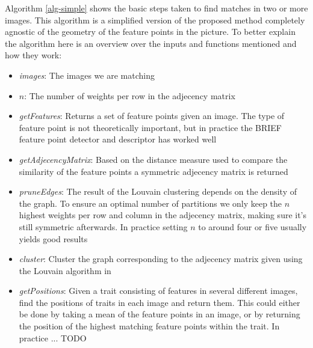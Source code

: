 \documentclass{article}
\begin{document}
Algorithm \ref{alg-simple} shows the basic steps taken to find matches 
in two or more images. This algorithm is a simplified version of the 
proposed method completely agnostic of the geometry of the feature 
points in the picture. To better explain the algorithm here is an 
overview over the inputs and functions mentioned and how they work:
\begin{itemize}
\item[]{\emph{images}: The images we are matching}
\item[]{\emph{$n$}: The number of weights per row in the adjecency 
matrix}
\item[]{\emph{getFeatures}: Returns a set of feature points given an 
image. The type of feature point is not theoretically important, but in 
practice the BRIEF\cite{calonder2010brief} feature point detector and 
descriptor has worked well} 
\item[]{\emph{getAdjecencyMatrix}: Based on the distance measure used to 
compare the similarity of the feature points a symmetric adjecency 
matrix is returned}
\item[]{\emph{pruneEdges}: The result of the Louvain clustering depends 
on the density of the graph. To ensure an optimal number of partitions 
we only keep the $n$ highest weights per row and column in the adjecency 
matrix, making sure it's still symmetric afterwards. In practice setting 
$n$ to around four or five usually yields good results}
\item[]{\emph{cluster}: Cluster the graph corresponding to the adjecency 
matrix given using the Louvain algorithm in \cite{blondel2008}}
\item[]{\emph{getPositions}: Given a trait consisting of features in 
several different images, find the positions of traits in each image and 
return them. This could either be done by taking a mean of the feature 
points in an image, or by returning the position of the highest matching 
feature points within the trait. In practice ... TODO}
\end{itemize}
\end{document}
